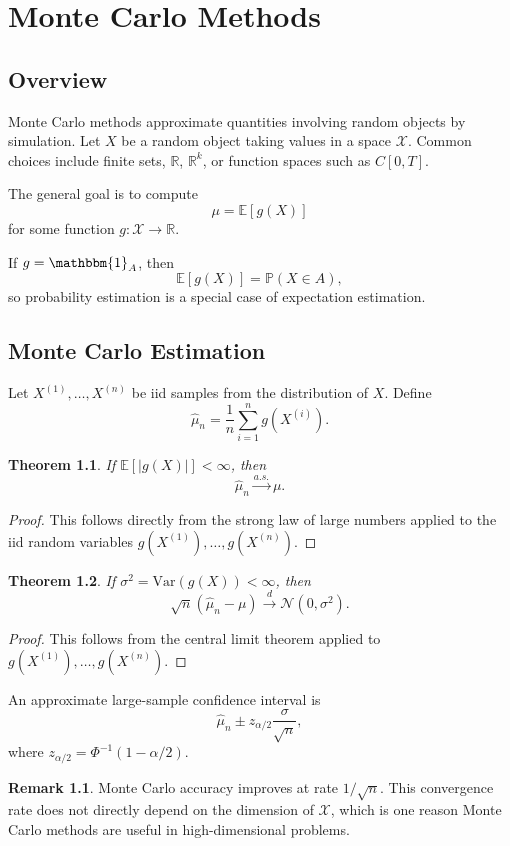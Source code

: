 \documentclass[12pt,oneside]{book}
\numberwithin{equation}{section}
\theoremstyle{definition}
\newtheorem{remark}{Remark}[section]
\theoremstyle{plain}
\newtheorem{theorem}{Theorem}[section]
\theoremstyle{remark}
\newcommand{\R}{\mathbb{R}}
\newcommand{\E}{\mathbb{E}}
\newcommand{\Var}{\mathrm{Var}}
\newcommand{\Prob}{\mathbb{P}}
\newcommand{\ind}{\mathbbm{1}}
\newcommand{\convd}{\overset{d}{\to}}
\newcommand{\as}{\overset{a.s.}{\to}}
\newcommand{\Normal}{\mathcal{N}}
\begin{document}
\chapter{Monte Carlo Methods}

\section{Overview}

Monte Carlo methods approximate quantities involving random objects by simulation. Let $X$ be a random object taking values in a space $\mathcal{X}$. Common choices include finite sets, $\R$, $\R^k$, or function spaces such as $C[0,T]$.

The general goal is to compute
\[
\mu = \E[g(X)]
\]
for some function $g:\mathcal{X}\to\R$.

If $g=\ind_A$, then
\[
\E[g(X)] = \Prob(X\in A),
\]
so probability estimation is a special case of expectation estimation.

\section{Monte Carlo Estimation}

Let $X^{(1)},\ldots,X^{(n)}$ be iid samples from the distribution of $X$. Define
\[
\hat{\mu}_n = \frac{1}{n}\sum_{i=1}^n g(X^{(i)}).
\]

\begin{theorem}
If $\E[|g(X)|]<\infty$, then
\[
\hat{\mu}_n \as \mu.
\]
\end{theorem}

\begin{proof}
This follows directly from the strong law of large numbers applied to the iid random variables $g(X^{(1)}),\ldots,g(X^{(n)})$.
\end{proof}

\begin{theorem}
If $\sigma^2=\Var(g(X))<\infty$, then
\[
\sqrt{n}(\hat{\mu}_n-\mu)\convd \Normal(0,\sigma^2).
\]
\end{theorem}

\begin{proof}
This follows from the central limit theorem applied to $g(X^{(1)}),\ldots,g(X^{(n)})$.
\end{proof}

An approximate large-sample confidence interval is
\[
\hat{\mu}_n
\pm
z_{\alpha/2}\frac{\sigma}{\sqrt{n}},
\]
where $z_{\alpha/2}=\Phi^{-1}(1-\alpha/2)$.

\begin{remark}
Monte Carlo accuracy improves at rate $1/\sqrt{n}$. This convergence rate does not directly depend on the dimension of $\mathcal{X}$, which is one reason Monte Carlo methods are useful in high-dimensional problems.
\end{remark}
\end{document}
